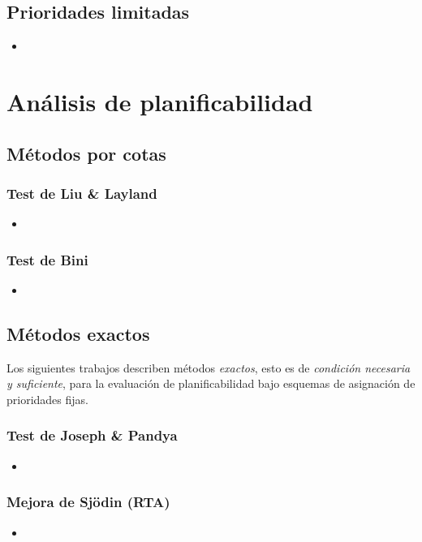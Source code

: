 \documentclass{article}
\begin{document}
\subsection*{Prioridades limitadas}
\begin{itemize}
    \item {}
\end{itemize}

\section{Análisis de planificabilidad}
\subsection{Métodos por cotas}
\subsubsection*{Test de Liu \& Layland}
\begin{itemize}
    \item {}
\end{itemize}  
\subsubsection*{Test de Bini}
\begin{itemize}
    \item {}
\end{itemize}    
    
\subsection{Métodos exactos}
Los siguientes trabajos describen métodos \emph{exactos}, esto es de \emph{condición necesaria y suficiente}, para la evaluación de planificabilidad bajo esquemas de asignación de prioridades fijas.
\subsubsection*{Test de Joseph \& Pandya}
\begin{itemize}
    \item {}
\end{itemize}
\subsubsection*{Mejora de Sjödin (RTA)}
\begin{itemize}
    \item {}
\end{itemize}
\end{document}
